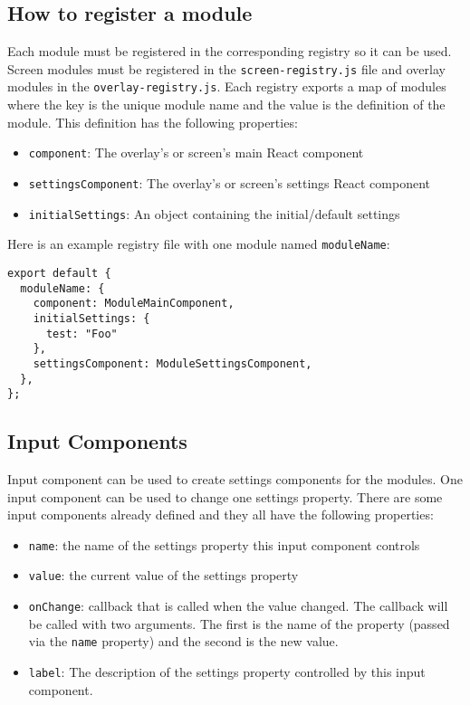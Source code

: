 \subsection{How to register a module}
Each module must be registered in the corresponding registry so it can be used. 
Screen modules must be registered in the \texttt{screen-registry.js} file and overlay modules in the \texttt{overlay-registry.js}. 
Each registry exports a map of modules where the key is the unique module name and the value is the definition of the module. 
This definition has the following properties:
\begin{itemize}
  \item \texttt{component}: The overlay's or screen's main React component
  \item \texttt{settingsComponent}: The overlay's or screen's settings React component
  \item \texttt{initialSettings}: An object containing the initial/default settings
\end{itemize}

Here is an example registry file with one module named \texttt{moduleName}:
\begin{verbatim}
export default {
  moduleName: {
    component: ModuleMainComponent,
    initialSettings: {
      test: "Foo"
    },
    settingsComponent: ModuleSettingsComponent,
  },
};
\end{verbatim}

\subsection{Input Components}
\label{sec:input-components}
Input component can be used to create settings components for the modules.
One input component can be used to change one settings property.
There are some input components already defined and they all have the following properties:
\begin{itemize}
  \item \texttt{name}: the name of the settings property this input component controls
  \item \texttt{value}: the current value of the settings property
  \item \texttt{onChange}: callback that is called when the value changed. 
    The callback will be called with two arguments.
    The first is the name of the property (passed via the \texttt{name} property) and the second is the new value.
  \item \texttt{label}: The description of the settings property controlled by this input component.
\end{itemize}

